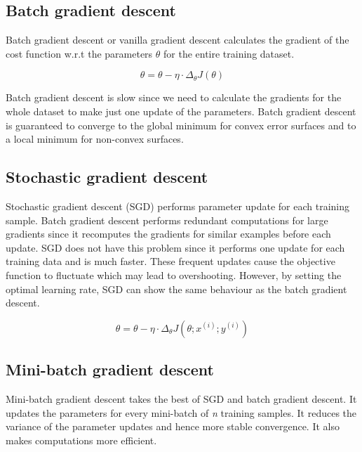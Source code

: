 \documentclass[a4paper, 12pt, oneside, BCOR1cm,toc=chapterentrywithdots]{scrbook}
\begin{document}
\subsection{Batch gradient descent}

Batch gradient descent or vanilla gradient descent calculates the gradient of the cost function w.r.t the parameters $\theta$ for the entire training dataset. 

\begin{equation} \label{eqn:3}
\theta = \theta - \eta \cdot \Delta_{\theta} J(\theta)
\end{equation}

Batch gradient descent is slow since we need to calculate the gradients for the whole dataset to make just one update of the parameters. Batch gradient descent is guaranteed to converge to the global minimum for convex error surfaces and to a local minimum for non-convex surfaces.

\subsection{Stochastic gradient descent}

Stochastic gradient descent (SGD) performs parameter update for each training sample. Batch gradient descent performs redundant computations for large gradients since it recomputes the gradients for similar examples before each update. SGD does not have this problem since it performs one update for each training data and is much faster. These frequent updates cause the objective function to fluctuate which may lead to overshooting. However, by setting the optimal learning rate, SGD can show the same behaviour as the batch gradient descent.

\begin{equation} \label{eqn:4}
\theta = \theta - \eta \cdot \Delta_{\theta} J(\theta; x^{(i)}; y^{(i)})
\end{equation}


\subsection{Mini-batch gradient descent}

Mini-batch gradient descent takes the best of SGD and batch gradient descent. It updates the parameters for every mini-batch of \textit{n} training samples. It reduces the variance of the parameter updates and hence more stable convergence. It also makes computations more efficient. 
\end{document}
